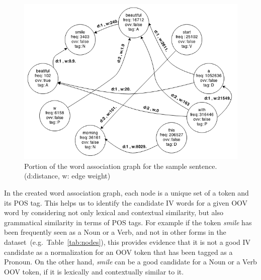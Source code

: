 \documentclass[a4paper,onesided,12pt]{report}
\begin{document}
\begin{figure}[htb]
\begin{center}
\includegraphics[scale=0.6]{fig/graph}
\caption{Portion of the word association graph for the sample sentence. (d:distance, w: edge weight)}
\label{fig:graph}
\end{center}
\end{figure}



In the created word association graph, each node is a unique set of a token and its POS tag. This helps us to identify the candidate IV words for a given OOV word by considering not only lexical and contextual similarity, but also grammatical similarity in terms of POS tags. For example if the token \textit{smile} has been frequently seen as a Noun or a Verb, and not in other forms in the dataset~(e.g.~Table~\ref{tab:nodes}), this provides evidence that it is not a good IV candidate as a normalization for an OOV token that has  been tagged as a Pronoun. On the other hand, \textit{smile} can be a good candidate for a Noun or a Verb OOV token, if it is lexically and contextually similar to it.
\end{document}
